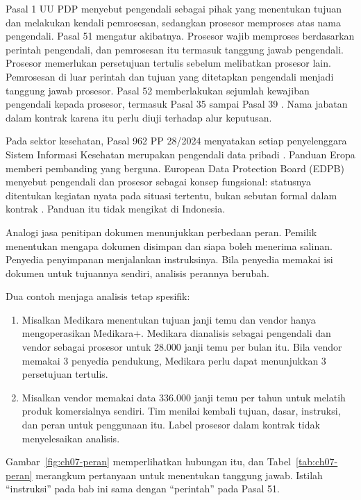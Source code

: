 Pasal 1 UU PDP menyebut pengendali sebagai pihak yang menentukan tujuan dan melakukan kendali
pemrosesan, sedangkan prosesor memproses atas nama pengendali. Pasal 51 mengatur akibatnya. Prosesor
wajib memproses berdasarkan perintah pengendali, dan pemrosesan itu termasuk tanggung jawab
pengendali. Prosesor memerlukan persetujuan tertulis sebelum melibatkan prosesor lain. Pemrosesan di
luar perintah dan tujuan yang ditetapkan pengendali menjadi tanggung jawab prosesor. Pasal 52
memberlakukan sejumlah kewajiban pengendali kepada prosesor, termasuk Pasal 35 sampai Pasal 39
\cite{uu27-2022-pdp}. Nama jabatan dalam kontrak karena itu perlu diuji terhadap alur keputusan.

Pada sektor kesehatan, Pasal 962 PP 28/2024 menyatakan setiap penyelenggara Sistem Informasi
Kesehatan merupakan pengendali data pribadi \cite{pp28-2024-kesehatan}. Panduan Eropa memberi
pembanding yang berguna. European Data Protection Board (EDPB) menyebut pengendali dan prosesor
sebagai konsep fungsional: statusnya ditentukan kegiatan nyata pada situasi tertentu, bukan sebutan
formal dalam kontrak \cite{c07-edpb-roles}. Panduan itu tidak mengikat di Indonesia.

Analogi jasa penitipan dokumen menunjukkan perbedaan peran. Pemilik menentukan mengapa dokumen
disimpan dan siapa boleh menerima salinan. Penyedia penyimpanan menjalankan instruksinya. Bila
penyedia memakai isi dokumen untuk tujuannya sendiri, analisis perannya berubah.

Dua contoh menjaga analisis tetap spesifik:
\begin{enumerate}
  \item Misalkan Medikara menentukan tujuan janji temu dan vendor hanya mengoperasikan Medikara+.
  Medikara dianalisis sebagai pengendali dan vendor sebagai prosesor untuk 28.000 janji temu per
  bulan itu. Bila vendor memakai 3 penyedia pendukung, Medikara perlu dapat menunjukkan 3
  persetujuan tertulis.
  \item Misalkan vendor memakai data 336.000 janji temu per tahun untuk melatih produk komersialnya
  sendiri. Tim menilai kembali tujuan, dasar, instruksi, dan peran untuk penggunaan itu. Label
  prosesor dalam kontrak tidak menyelesaikan analisis.
\end{enumerate}

Gambar~\ref{fig:ch07-peran} memperlihatkan hubungan itu, dan Tabel~\ref{tab:ch07-peran} merangkum
pertanyaan untuk menentukan tanggung jawab. Istilah ``instruksi'' pada bab ini sama dengan
``perintah'' pada Pasal 51.

